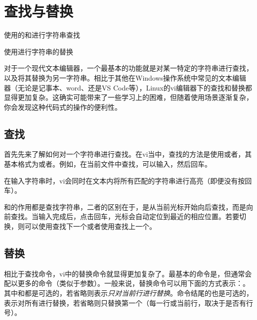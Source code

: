 \section{查找与替换}\label{sec:查找与替换}

\begin{Abstract}
    \item 使用的\code{/}和进行字符串查找
    \item 使用进行字符串的替换
\end{Abstract}

对于一个现代文本编辑器，一个最基本的功能就是对某一特定的字符串进行查找，以及将其替换为另一字符串。相比于其他在Windows操作系统中常见的文本编辑器（无论是记事本、word、还是VS Code等），Linux的vi编辑器下的查找和替换都显得更加复杂。这确实可能带来了一些学习上的困难，但随着使用场景逐渐复杂，你会发现这种代码式的操作的便利性。

\subsection{查找}\label{subsec:查找与替换-查找}

首先先来了解如何对一个字符串进行查找。在vi当中，查找的方法是使用或者，其基本格式为\code{/[要查找的字符串]}或者。例如，在当前文件中查找，可以输入，然后回车。

\begin{attention}
    在输入字符串时，vi会同时在文本内将所有匹配的字符串进行高亮（即便没有按回车）。

    \code{/}和的作用都是查找字符串，二者的区别在于，\code{/}是从当前光标开始向后查找，而是向前查找。当输入完成后，点击回车，光标会自动定位到最近的相应位置。若要切换，则可以使用查找下一个或者使用查找上一个。
\end{attention}

\subsection{替换}\label{subsec:查找与替换-替换}

相比于查找命令，vi中的替换命令就显得更加复杂了。最基本的命令是，但通常会配以更多的命令（类似于参数）。一般来说，替换命令可以用下面的方式表示：。其中和都是可选的，若省略则表示\emph{只对当前行进行替换}。命令结尾的也是可选的，表示对所有进行替换，若省略则只替换第一个（每一行或当前行，取决于是否有行号）。

